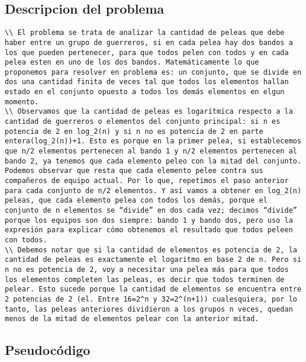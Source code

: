 \documentclass[10pt,a4paper]{article}
\begin{document}
\subtitle{Ejercicio 3}

\subsection{Descripcion del problema}

\begin{verbatim}
\\ El problema se trata de analizar la cantidad de peleas que debe haber entre un grupo de guerreros, si en cada pelea hay dos bandos a los que pueden pertenecer, para que todos pelen con todos y en cada pelea esten en uno de los dos bandos. Matemáticamente lo que proponemos para resolver en problema es: un conjunto, que se divide en dos una cantidad finita de veces tal que todos los elementos hallan estado en el conjunto opuesto a todos los demás elementos en elgun momento.
\\ Observamos que la cantidad de peleas es logarítmica respecto a la cantidad de guerreros o elementos del conjunto principal: si n es potencia de 2 en log_2(n) y si n no es potencia de 2 en parte entera(log_2(n))+1. Esto es porque en la primer pelea, si establecemos que n/2 elementos pertenecen al bando 1 y n/2 elementos pertenecen al bando 2, ya tenemos que cada elemento peleo con la mitad del conjunto. Podemos observar que resta que cada elemento pelee contra sus compañeros de equipo actual. Por lo que, repetimos el paso anterior para cada conjunto de n/2 elementos. Y así vamos a obtener en log_2(n) peleas, que cada elemento pelea con todos los demás, porque el conjunto de n elementos se “divide” en dos cada vez; decimos “divide” porque los equipos son dos siempre: bando 1 y bando dos, pero uso la expresión para explicar cómo obtenemos el resultado que todos peleen con todos. 
\\ Debemos notar que si la cantidad de elementos es potencia de 2, la cantidad de peleas es exactamente el logaritmo en base 2 de n. Pero si n no es potencia de 2, voy a necesitar una pelea más para que todos los elementos completen las peleas, es decir que todos terminen de pelear. Esto sucede porque la cantidad de elementos se encuentra entre 2 potencias de 2 (el. Entre 16=2^n y 32=2^(n+1)) cualesquiera, por lo tanto, las peleas anteriores dividieron a los grupos n veces, quedan menos de la mitad de elementos pelear con la anterior mitad. 
\end{verbatim}
\subsection{Pseudocódigo}
\end{document}
